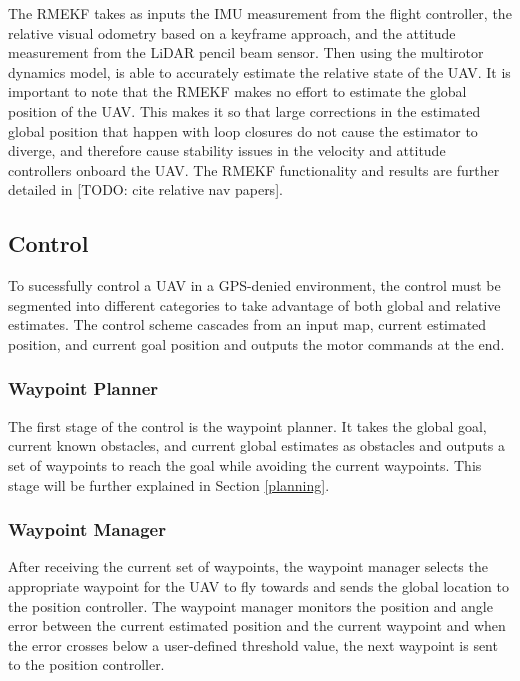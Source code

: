 \documentclass[letterpaper, 10 pt, conference]{ieeeconf}  %
\newcommand{\todo}[1]{{\color{blue}[TODO: #1]}}
\begin{document}
The RMEKF takes as inputs the IMU measurement from the flight controller, the relative visual odometry based on a keyframe approach, and the attitude measurement from the LiDAR pencil beam sensor. Then using the multirotor dynamics model, is able to accurately estimate the relative state of the UAV. It is important to note that the RMEKF makes no effort to estimate the global position of the UAV. This makes it so that large corrections in the estimated global position that happen with loop closures do not cause the estimator to diverge, and therefore cause stability issues in the velocity and attitude controllers onboard the UAV. The RMEKF functionality and results are further detailed in \todo{cite relative nav papers}.

\subsection{Control}

To sucessfully control a UAV in a GPS-denied environment, the control must be segmented into different categories to take advantage of both global and relative estimates. The control scheme cascades from an input map, current estimated position, and current goal position and outputs the motor commands at the end.

\subsubsection{Waypoint Planner}

The first stage of the control is the waypoint planner. It takes the global goal, current known obstacles, and current global estimates as obstacles and outputs a set of waypoints to reach the goal while avoiding the current waypoints. This stage will be further explained in Section \ref{planning}.

\subsubsection{Waypoint Manager}

After receiving the current set of waypoints, the waypoint manager selects the appropriate waypoint for the UAV to fly towards and sends the global location to the position controller. The waypoint manager monitors the position and angle error between the current estimated position and the current waypoint and when the error crosses below a user-defined threshold value, the next waypoint is sent to the position controller.
\end{document}
